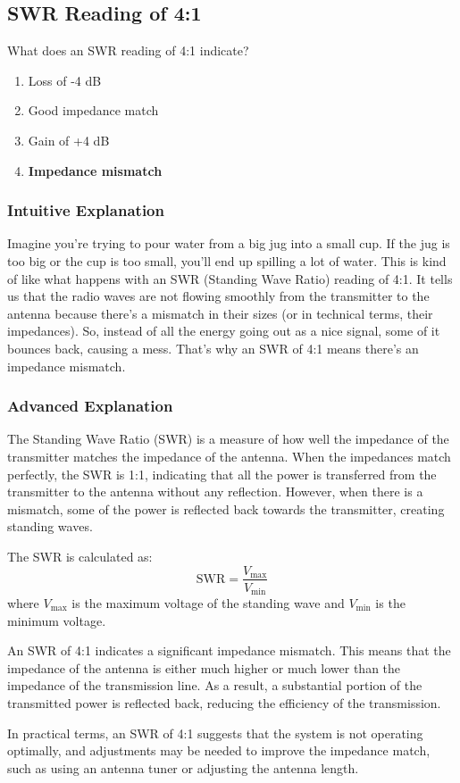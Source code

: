 \subsection{SWR Reading of 4:1}
\label{T7C06}

\begin{tcolorbox}[colback=gray!10!white,colframe=black!75!black,title=T7C06]
What does an SWR reading of 4:1 indicate?
\begin{enumerate}[label=\Alph*)]
    \item Loss of -4 dB
    \item Good impedance match
    \item Gain of +4 dB
    \item \textbf{Impedance mismatch}
\end{enumerate}
\end{tcolorbox}

\subsubsection{Intuitive Explanation}
Imagine you're trying to pour water from a big jug into a small cup. If the jug is too big or the cup is too small, you'll end up spilling a lot of water. This is kind of like what happens with an SWR (Standing Wave Ratio) reading of 4:1. It tells us that the radio waves are not flowing smoothly from the transmitter to the antenna because there's a mismatch in their sizes (or in technical terms, their impedances). So, instead of all the energy going out as a nice signal, some of it bounces back, causing a mess. That's why an SWR of 4:1 means there's an impedance mismatch.

\subsubsection{Advanced Explanation}
The Standing Wave Ratio (SWR) is a measure of how well the impedance of the transmitter matches the impedance of the antenna. When the impedances match perfectly, the SWR is 1:1, indicating that all the power is transferred from the transmitter to the antenna without any reflection. However, when there is a mismatch, some of the power is reflected back towards the transmitter, creating standing waves.

The SWR is calculated as:
\[
\text{SWR} = \frac{V_{\text{max}}}{V_{\text{min}}}
\]
where \(V_{\text{max}}\) is the maximum voltage of the standing wave and \(V_{\text{min}}\) is the minimum voltage.

An SWR of 4:1 indicates a significant impedance mismatch. This means that the impedance of the antenna is either much higher or much lower than the impedance of the transmission line. As a result, a substantial portion of the transmitted power is reflected back, reducing the efficiency of the transmission.

In practical terms, an SWR of 4:1 suggests that the system is not operating optimally, and adjustments may be needed to improve the impedance match, such as using an antenna tuner or adjusting the antenna length.

